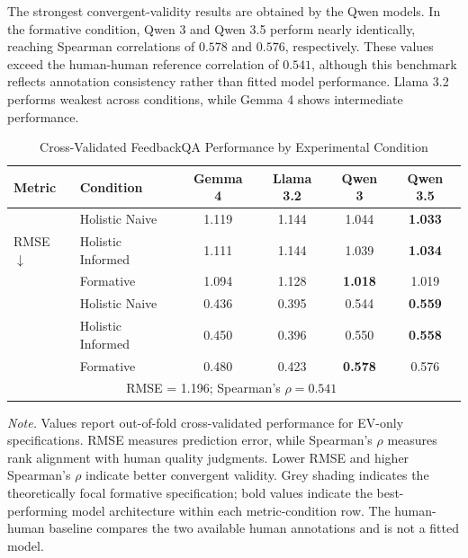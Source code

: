 The strongest convergent-validity results are obtained by the Qwen models. In the formative condition, Qwen 3 and Qwen 3.5 perform nearly identically, reaching Spearman correlations of $0.578$ and $0.576$, respectively. These values exceed the human-human reference correlation of $0.541$, although this benchmark reflects annotation consistency rather than fitted model performance. Llama 3.2 performs weakest across conditions, while Gemma 4 shows intermediate performance.

\begin{table}[ht]
    \centering
    \caption{Cross-Validated FeedbackQA Performance by Experimental Condition}
    \label{tab:feedbackqa_cv_compact}
    \begin{tabular}{llcccc}
    \toprule
    Metric & Condition & Gemma 4 & Llama 3.2 & Qwen 3 & Qwen 3.5 \\
    \midrule
    \multirow{3}{*}{RMSE $\downarrow$} 
        & Holistic Naive    & 1.119 & 1.144 & 1.044 & \textbf{1.033} \\
        & Holistic Informed & 1.111 & 1.144 & 1.039 & \textbf{1.034} \\
    \rowcolor{focalrow}
        & Formative         & 1.094 & 1.128 & \textbf{1.018} & 1.019 \\
    \addlinespace[0.5em]
    \multirow{3}{*}{Spearman's $\rho$ $\uparrow$}
        & Holistic Naive    & 0.436 & 0.395 & 0.544 & \textbf{0.559} \\
        & Holistic Informed & 0.450 & 0.396 & 0.550 & \textbf{0.558} \\
    \rowcolor{focalrow}
        & Formative         & 0.480 & 0.423 & \textbf{0.578} & 0.576 \\
    \addlinespace[0.5em]
    \multicolumn{2}{l}{Human-Human Baseline} 
        & \multicolumn{4}{c}{RMSE = 1.196; Spearman's $\rho = 0.541$} \\
    \bottomrule
    \end{tabular}

    \begin{flushleft}
    \footnotesize
    \textit{Note.} Values report out-of-fold cross-validated performance for EV-only specifications. RMSE measures prediction error, while Spearman's $\rho$ measures rank alignment with human quality judgments. Lower RMSE and higher Spearman's $\rho$ indicate better convergent validity. Grey shading indicates the theoretically focal formative specification; bold values indicate the best-performing model architecture within each metric-condition row. The human-human baseline compares the two available human annotations and is not a fitted model.
    \end{flushleft}
\end{table}


